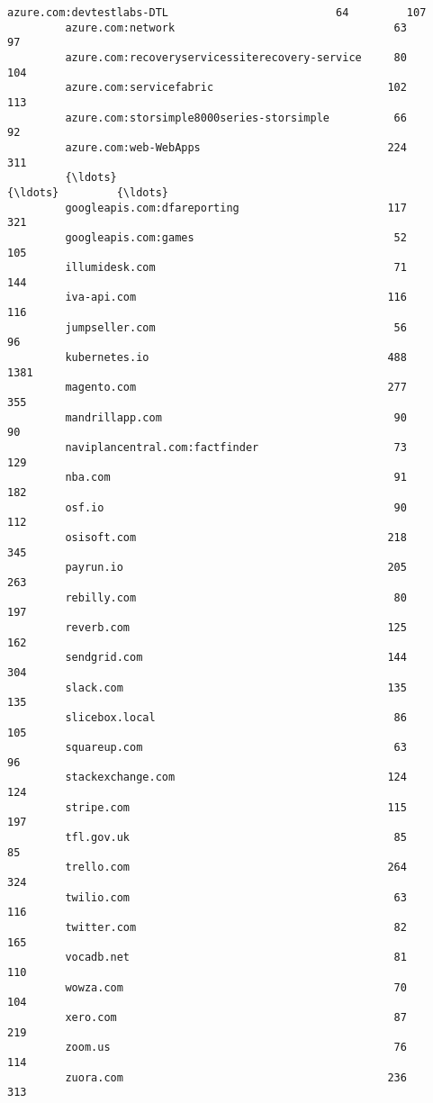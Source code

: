 \documentclass[11pt]{article}
\begin{document}
\begin{Verbatim}[commandchars=\\\{\}]
         azure.com:devtestlabs-DTL                          64         107   
         azure.com:network                                  63          97   
         azure.com:recoveryservicessiterecovery-service     80         104   
         azure.com:servicefabric                           102         113   
         azure.com:storsimple8000series-storsimple          66          92   
         azure.com:web-WebApps                             224         311   
         {\ldots}                                               {\ldots}         {\ldots}   
         googleapis.com:dfareporting                       117         321   
         googleapis.com:games                               52         105   
         illumidesk.com                                     71         144   
         iva-api.com                                       116         116   
         jumpseller.com                                     56          96   
         kubernetes.io                                     488        1381   
         magento.com                                       277         355   
         mandrillapp.com                                    90          90   
         naviplancentral.com:factfinder                     73         129   
         nba.com                                            91         182   
         osf.io                                             90         112   
         osisoft.com                                       218         345   
         payrun.io                                         205         263   
         rebilly.com                                        80         197   
         reverb.com                                        125         162   
         sendgrid.com                                      144         304   
         slack.com                                         135         135   
         slicebox.local                                     86         105   
         squareup.com                                       63          96   
         stackexchange.com                                 124         124   
         stripe.com                                        115         197   
         tfl.gov.uk                                         85          85   
         trello.com                                        264         324   
         twilio.com                                         63         116   
         twitter.com                                        82         165   
         vocadb.net                                         81         110   
         wowza.com                                          70         104   
         xero.com                                           87         219   
         zoom.us                                            76         114   
         zuora.com                                         236         313   
         

\end{Verbatim}
\end{document}
